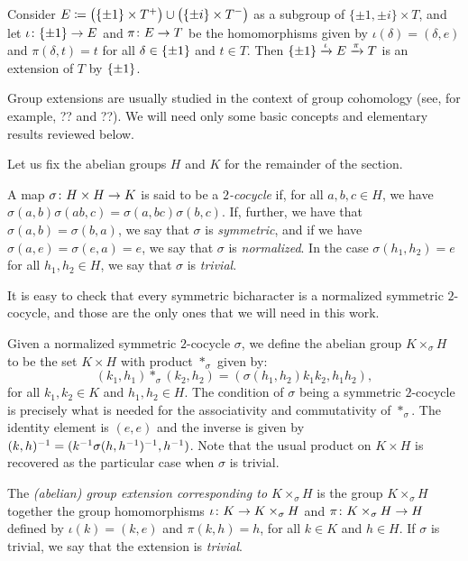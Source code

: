 \begin{ex}\label{ex:main-extension}
	Consider $E \coloneqq \big(\{ \pm 1 \} \times T^+\big) \cup \big(\{\pm i\} \times T^-\big)$ as a subgroup of $\{ \pm 1, \pm i \} \times T$, and let $\iota\colon \{ \pm 1 \} \to E$ and $\pi\colon E \to T$ be the homomorphisms given by $\iota(\delta) = (\delta, e)$ and $\pi (\delta, t) = t$ for all $\delta \in \{ \pm 1 \}$ and $t\in T$.
	Then $\{ \pm 1 \} \xrightarrow{\iota} E \xrightarrow{\pi} T$ is an extension of $T$ by $\{ \pm 1 \}$.
\end{ex}

Group extensions are usually studied in the context of group cohomology (see, for example, ?? and ??).
We will need only some basic concepts and elementary results reviewed below.

Let us fix the abelian groups $H$ and $K$ for the remainder of the section.

\begin{defi}
	A map $\sigma\colon H\times H \to K$ is said to be a \emph{$2$-cocycle} if, for all $a,b,c \in H$, we have $\sigma(a,b) \sigma(ab, c) = \sigma(a, bc) \sigma(b,c)$.
	If, further, we have that $\sigma(a,b) = \sigma(b,a)$, we say that $\sigma$ is \emph{symmetric}, and if we have $\sigma(a, e) = \sigma(e, a) = e$, we say that $\sigma$ is \emph{normalized}.
	In the case $\sigma(h_1, h_2) = e$ for all $h_1, h_2 \in H$, we say that $\sigma$ is \emph{trivial}.
\end{defi}

It is easy to check that every symmetric bicharacter is a normalized symmetric $2$-cocycle, and those are the only ones that we will need in this work.

Given a normalized symmetric $2$-cocycle $\sigma$, we define the abelian group $K \times_\sigma H$ to be the set $K\times H$ with product $*_\sigma$ given by:
\[
	(k_1, h_1)*_\sigma(k_2, h_2) = (\sigma(h_1, h_2) k_1 k_2, h_1 h_2),
\]
for all $k_1, k_2 \in K$ and $h_1, h_2 \in H$.
The condition of $\sigma$ being a symmetric $2$-cocycle is precisely what is needed for the associativity and commutativity of $*_\sigma$.
The identity element is $(e, e)$ and the inverse is given by $(k, h)^{-1} = (k^{-1} \sigma(h,h^{-1})^{-1}, h^{-1})$.
Note that the usual product on $K\times H$ is recovered as the particular case when $\sigma$ is trivial.

\begin{defi}
	The \emph{(abelian) group extension corresponding to $K \times_\sigma H$} is the group $K \times_\sigma H$ together the group homomorphisms $\iota \colon K \to K \times_\sigma H$ and $\pi \colon K \times_\sigma H \to H$ defined by $\iota (k) = (k , e)$ and $\pi (k, h) = h$, for all $k\in K$ and $h\in H$.
	If $\sigma$ is trivial, we say that the extension is \emph{trivial}.
\end{defi}

